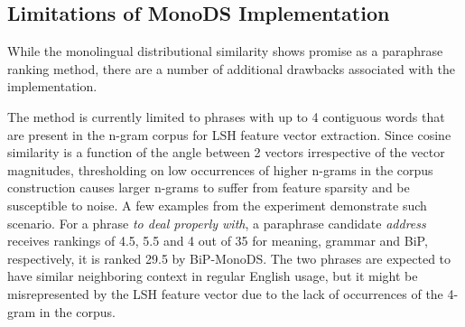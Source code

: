 \documentclass[11pt]{article}
\newcommand{\mnote}[1]{\marginpar{\raggedleft\footnotesize\itshape#1}}
\begin{document}
{{\vspace{-.2cm}
\subsection{Limitations of MonoDS Implementation}%
\vspace{-.1cm}

While the monolingual distributional similarity shows promise as a paraphrase ranking method, there are a number of additional drawbacks associated with the implementation.%

The method is currently limited to phrases with up to 4 contiguous words that are present in the n-gram corpus for LSH feature vector extraction. Since cosine similarity is a function of the angle between 2 vectors irrespective of the vector magnitudes, thresholding on low occurrences of higher n-grams in the corpus construction causes larger n-grams to suffer from feature sparsity and be susceptible to noise. A few examples from the experiment demonstrate such scenario. For a phrase \emph{to deal properly with}, a paraphrase candidate \emph{address} receives rankings of 4.5, 5.5 and 4 out of 35 for meaning, grammar and BiP, respectively, it is ranked 29.5 by BiP-MonoDS. The two phrases are expected to have similar neighboring context in regular English usage, but it might be misrepresented by the LSH feature vector due to the lack of occurrences of the 4-gram in the corpus.

}}
\end{document}

